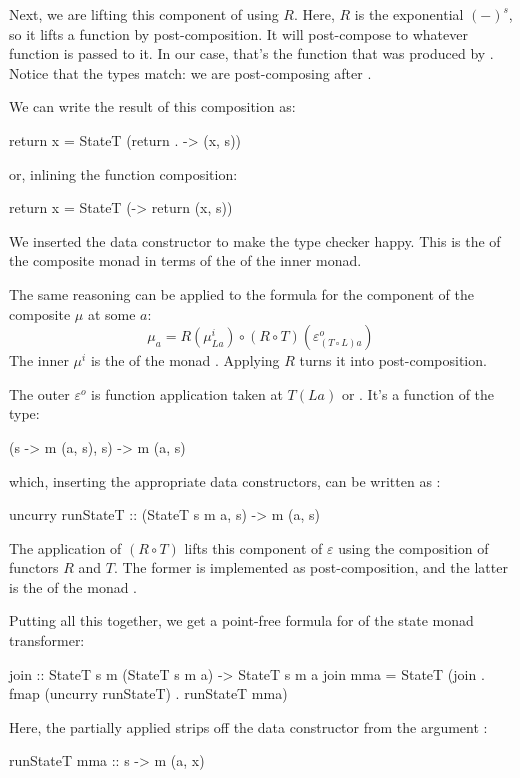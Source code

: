 \documentclass[DaoFP]{subfiles}
\begin{document}
Next, we are lifting this component of  using $R$. Here, $R$ is the exponential $(-)^s$, so it lifts a function by post-composition. It will post-compose  to whatever function is passed to it. In our case, that's the function that was produced by . Notice that the types match: we are post-composing  after . 

We can write the result of this composition as:
\begin{haskell}
return x = StateT (return . \s -> (x, s))
\end{haskell}
or, inlining the function composition:
\begin{haskell}
return x = StateT (\s -> return (x, s))
\end{haskell}
We inserted the data constructor  to make the type checker happy. This is the  of the composite monad in terms of the  of the inner monad.

The same reasoning can be applied to the formula for the component of the composite $\mu$ at some $a$: 
\[ \mu_a = R(\mu^i_{L a}) \circ (R \circ T) (\varepsilon^o_{(T\circ L) a})\]
The inner $\mu^i$ is the  of the monad . Applying $R$ turns it into post-composition. 

The outer $\varepsilon^o$ is function application taken at $T(L a)$ or . It's a function of the type:
\begin{haskell}
(s -> m (a, s), s) -> m (a, s)
\end{haskell}
which, inserting the appropriate data constructors, can be written as :
\begin{haskell}
uncurry runStateT :: (StateT s m a, s) -> m (a, s)
\end{haskell}
The application of $(R \circ T)$ lifts this component of $\varepsilon$ using the composition of functors $R$ and $T$. The former is implemented as  post-composition, and the latter is the  of the monad . 

Putting all this together, we get a point-free formula for  of the state monad transformer:
\begin{haskell}
join :: StateT s m (StateT s m a) -> StateT s m a
join mma = StateT (join . fmap (uncurry runStateT) . runStateT mma)
\end{haskell}
Here, the partially applied  strips off the data constructor from the argument :
\begin{haskell}
runStateT mma :: s -> m (a, x)
\end{haskell}
\end{document}
